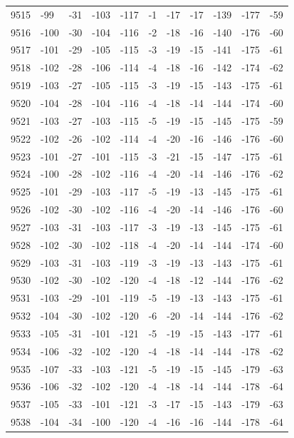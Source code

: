 \begin{table}[H]
\begin{tabular}{lllllllllll}
9515 & -99 & -31 & -103 & -117 & -1 & -17 & -17 & -139 & -177 & -59 \\
9516 & -100 & -30 & -104 & -116 & -2 & -18 & -16 & -140 & -176 & -60 \\
9517 & -101 & -29 & -105 & -115 & -3 & -19 & -15 & -141 & -175 & -61 \\
9518 & -102 & -28 & -106 & -114 & -4 & -18 & -16 & -142 & -174 & -62 \\
9519 & -103 & -27 & -105 & -115 & -3 & -19 & -15 & -143 & -175 & -61 \\
9520 & -104 & -28 & -104 & -116 & -4 & -18 & -14 & -144 & -174 & -60 \\
9521 & -103 & -27 & -103 & -115 & -5 & -19 & -15 & -145 & -175 & -59 \\
9522 & -102 & -26 & -102 & -114 & -4 & -20 & -16 & -146 & -176 & -60 \\
9523 & -101 & -27 & -101 & -115 & -3 & -21 & -15 & -147 & -175 & -61 \\
9524 & -100 & -28 & -102 & -116 & -4 & -20 & -14 & -146 & -176 & -62 \\
9525 & -101 & -29 & -103 & -117 & -5 & -19 & -13 & -145 & -175 & -61 \\
9526 & -102 & -30 & -102 & -116 & -4 & -20 & -14 & -146 & -176 & -60 \\
9527 & -103 & -31 & -103 & -117 & -3 & -19 & -13 & -145 & -175 & -61 \\
9528 & -102 & -30 & -102 & -118 & -4 & -20 & -14 & -144 & -174 & -60 \\
9529 & -103 & -31 & -103 & -119 & -3 & -19 & -13 & -143 & -175 & -61 \\
9530 & -102 & -30 & -102 & -120 & -4 & -18 & -12 & -144 & -176 & -62 \\
9531 & -103 & -29 & -101 & -119 & -5 & -19 & -13 & -143 & -175 & -61 \\
9532 & -104 & -30 & -102 & -120 & -6 & -20 & -14 & -144 & -176 & -62 \\
9533 & -105 & -31 & -101 & -121 & -5 & -19 & -15 & -143 & -177 & -61 \\
9534 & -106 & -32 & -102 & -120 & -4 & -18 & -14 & -144 & -178 & -62 \\
9535 & -107 & -33 & -103 & -121 & -5 & -19 & -15 & -145 & -179 & -63 \\
9536 & -106 & -32 & -102 & -120 & -4 & -18 & -14 & -144 & -178 & -64 \\
9537 & -105 & -33 & -101 & -121 & -3 & -17 & -15 & -143 & -179 & -63 \\
9538 & -104 & -34 & -100 & -120 & -4 & -16 & -16 & -144 & -178 & -64 \\

\end{tabular}
\end{table}
